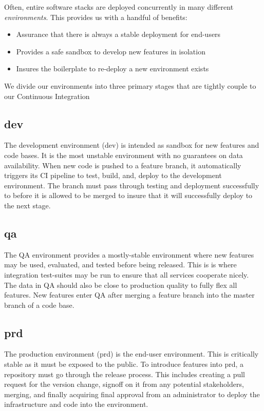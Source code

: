 \documentclass[a4paper,12pt,titlepage]{scrartcl}
\begin{document}
	Often, entire software stacks are deployed concurrently in many different {\em environments}. This provides us with a handful of benefits:
	
	\begin{itemize}  
	\item Assurance that there is always a stable deployment for end-users
	\item Provides a safe sandbox to develop new features in isolation
	\item Insures the boilerplate to re-deploy a new environment exists
	\end{itemize}
	
	We divide our environments into three primary stages that are tightly couple to our Continuous Integration
	
	\subsection{dev}
	
	The development environment (dev) is intended as sandbox for  new features and code bases.
	It is the most unstable environment with no guarantees on data availability.
	When new code is pushed to a feature branch, it automatically triggers its CI pipeline to test, build, and, deploy to the development environment.
	The branch must pass through testing and deployment successfully to before it is allowed to be merged to insure that it will successfully deploy to the next stage.
	
	\subsection{qa}
	
	The QA environment provides a mostly-stable environment where new features may be used, evaluated, and tested before being released.
	This is is where integration test-suites may be run to ensure that all services cooperate nicely.
	The data in QA should also be close to production quality to fully flex all features.
	New features enter QA after merging a feature branch into the master branch of a code base.
	
	\subsection{prd}
	
	The production environment (prd) is the end-user environment.
	This is critically stable as it must be exposed to the public.
	To introduce features into prd, a repository must go through the release process.
	This includes creating a pull request for the version change, signoff on it from any potential stakeholders, merging, and finally acquiring final approval from an administrator to deploy the infrastructure and code into the environment.
	
\end{document}
